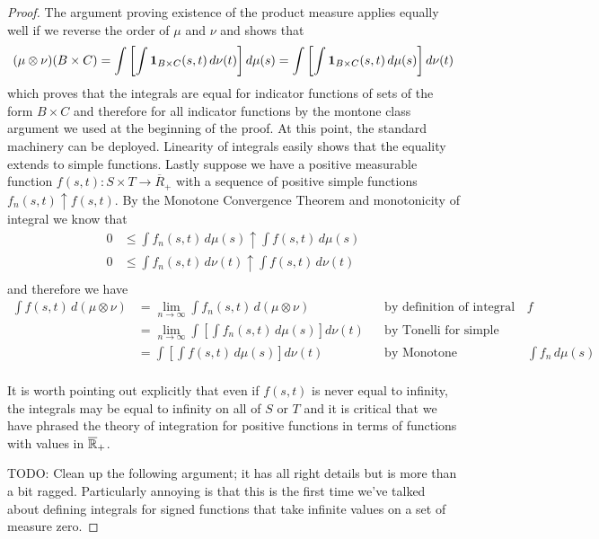 \documentclass{amsart}
\theoremstyle{remark}
\theoremstyle{definition}
\begin{document}
\begin{proof}
The argument proving existence of the product measure applies equally well if we reverse the order
of $\mu$ and $\nu$ and shows that 
\begin{align*}
(\mu \otimes \nu)(B \times C) = \int \left [ \int \textbf{1}_{B
    \times C}(s,t) \, d
\nu(t) \right ] d \mu(s) = \int \left [ \int \textbf{1}_{B \times C}(s,t)
\, d \mu(s) \right ] d \nu(t)
\end{align*}
which proves that the integrals are equal for indicator functions of
sets of the form $B \times C$ and therefore for all indicator
functions by the montone class argument we used at the beginning of
the proof.  At this point, the
standard machinery can be deployed.  Linearity of integrals easily
shows that the equality extends to simple functions.  Lastly suppose
we have a positive measurable function $f(s,t) : S \times T \to
\overline{R}_+$ with a sequence of positive simple functions
$f_n(s,t) \uparrow f(s,t)$.  By the Monotone Convergence Theorem and
monotonicity of integral we know that 
\begin{align*}
0 &\leq \int f_n(s,t) \, d\mu(s) \uparrow \int f(s,t) \, d\mu(s) \\
0 &\leq \int f_n(s,t) \, d\nu(t) \uparrow \int f(s,t) \, d\nu(t) \\
\end{align*}
and therefore we have
\begin{align*}
\int f(s,t) \,  d (\mu \otimes \nu) 
&= \lim_{n \to \infty} \int
 f_n(s,t) \,  d (\mu \otimes \nu)  & & \text{by definition of integral
   of $f$}\\
&= \lim_{n \to \infty} \int \left [
\int f_n(s,t) \,  d \mu(s) \right ] d\nu(t) & &\text{by Tonelli
for simple functions}\\
&= \int \left [
\int f(s,t) \,  d \mu(s) \right ] d\nu(t) & &\text{by Monotone Convergence
   on $\int f_n \, d \mu(s)$}\\
\end{align*}

It is worth pointing out explicitly that even if $f(s,t)$ is never
equal to infinity, the integrals may be equal to infinity on all of
$S$ or $T$ and it is critical that we have phrased the theory of
integration for positive functions in terms of functions with values
in $\overline{\mathbb{R}}_+$.

TODO: Clean up the following argument; it has all right details but is
more than a bit ragged.  Particularly annoying is that this is the
first time we've talked about defining integrals for signed functions
that take infinite values on a set of measure zero.


\end{proof}
\end{document}
